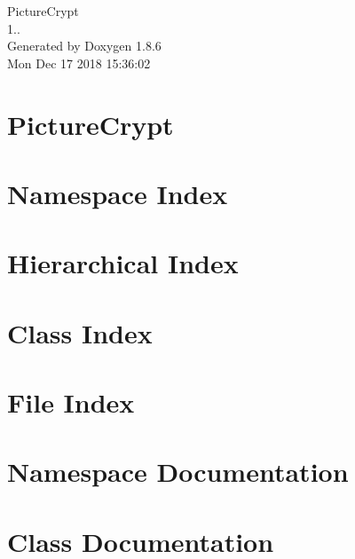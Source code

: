 \documentclass[twoside]{book}
\newcommand{\clearemptydoublepage}{%
  \newpage{\pagestyle{empty}\cleardoublepage}%
}
\begin{document}
\hypersetup{pageanchor=false}
\begin{titlepage}
\vspace*{7cm}
\begin{center}%
{\Large Picture\-Crypt \\[1ex]\large 1.. }\\
\vspace*{1cm}
{\large Generated by Doxygen 1.8.6}\\
\vspace*{0.5cm}
{\small Mon Dec 17 2018 15:36:02}\\
\end{center}
\end{titlepage}
\clearemptydoublepage
\tableofcontents
\clearemptydoublepage
{}
\hypersetup{pageanchor=true}

\chapter{Picture\-Crypt}
\label{index}\hypertarget{index}{}
\chapter{Namespace Index}

\chapter{Hierarchical Index}

\chapter{Class Index}

\chapter{File Index}

\chapter{Namespace Documentation}



\chapter{Class Documentation}







\end{document}
